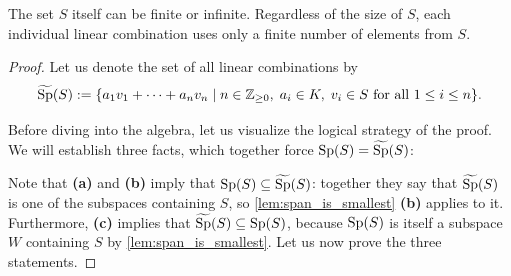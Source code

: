 \begin{remark}
\label{rem:S_finite_or_infinite}
The set $S$ itself can be finite or infinite. Regardless of the size of $S$, each individual linear combination uses only a finite number of elements from $S$.
\end{remark}

\begin{proof}
Let us denote the set of all linear combinations by
\[
\widetilde{\operatorname{Sp}}(S) := \{a_1 v_1 + \dots + a_n v_n \mid n \in \mathbb{Z}_{\ge 0}, \; a_i \in K, \; v_i \in S \text{ for all } 1 \le i \le n\}.
\]

Before diving into the algebra, let us visualize the logical strategy of the proof. We will establish three facts, which together force $\operatorname{Sp}(S) = \widetilde{\operatorname{Sp}}(S)$:

\begin{center}
\end{center}

Note that \textbf{(a)} and \textbf{(b)} imply that $\operatorname{Sp}(S) \subseteq \widetilde{\operatorname{Sp}}(S)$: together they say that $\widetilde{\operatorname{Sp}}(S)$ is one of the subspaces containing $S$, so \cref{lem:span_is_smallest} \textbf{(b)} applies to it. Furthermore, \textbf{(c)} implies that $\widetilde{\operatorname{Sp}}(S) \subseteq \operatorname{Sp}(S)$, because $\operatorname{Sp}(S)$ is itself a subspace $W$ containing $S$ by \cref{lem:span_is_smallest}. Let us now prove the three statements.


\end{proof}
